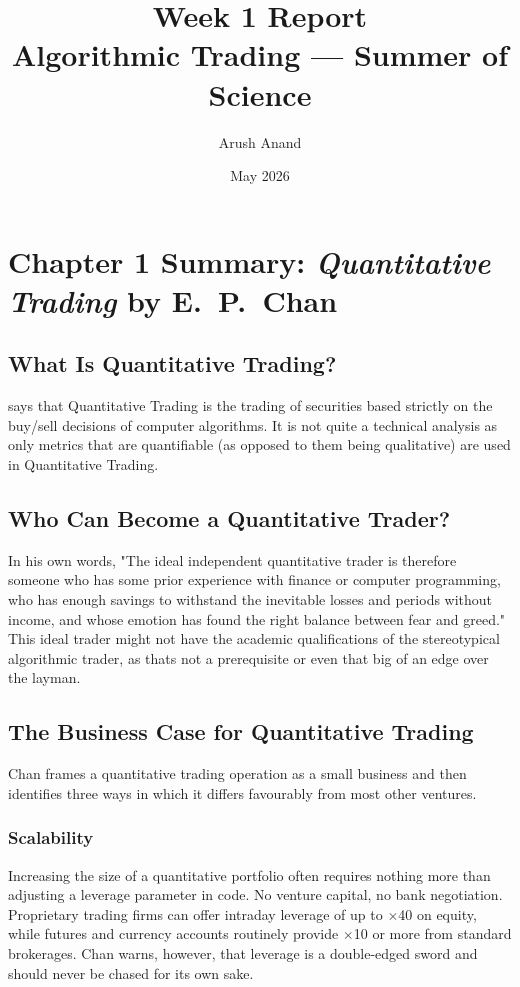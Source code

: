 \documentclass[12pt, a4paper]{article}
\title{\textbf{Week 1 Report}\\[0.4em]
  \large Algorithmic Trading --- Summer of Science}
\author{Arush Anand}
\date{May 2026}
\begin{document}
\maketitle
\tableofcontents
\newpage

\section{Chapter 1 Summary: \textit{Quantitative Trading} by E.\ P.\ Chan}

\subsection{What Is Quantitative Trading?}

\citet{chan2021} says that Quantitative Trading is the trading of 
securities based strictly on the buy/sell decisions of computer 
algorithms. It is not quite a technical analysis as only metrics
that are quantifiable (as opposed to them being qualitative) are
used in Quantitative Trading. 


\subsection{Who Can Become a Quantitative Trader?}

In his own words, 
"The ideal independent quantitative trader is therefore someone
who has some prior experience with finance or computer programming,
who has enough savings to withstand the inevitable losses and
periods without income, and whose emotion has found the right balance 
between fear and greed." This ideal trader might not have the academic
qualifications of the stereotypical algorithmic trader, as thats not
a prerequisite or even that big of an edge over the layman.

\subsection{The Business Case for Quantitative Trading}

Chan frames a quantitative trading operation as a small business and
then identifies three ways in which it differs favourably from most
other ventures.

\subsubsection*{Scalability}
Increasing the size of a quantitative portfolio often requires nothing
more than adjusting a leverage parameter in code. No venture capital,
no bank negotiation. Proprietary trading firms can offer intraday
leverage of up to $\times$40 on equity, while futures and currency
accounts routinely provide $\times$10 or more from standard brokerages.
Chan warns, however, that leverage is a double-edged sword and should
never be chased for its own sake.
\end{document}

